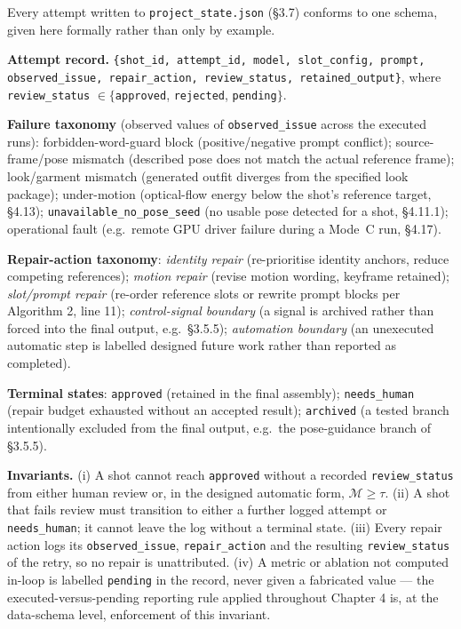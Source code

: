 \documentclass[10pt,twocolumn,letterpaper]{article}
\begin{document}
Every attempt written to \texttt{project\_state.json} (\S{}3.7) conforms to one schema, given here formally rather than only by example.

\textbf{Attempt record.} \texttt{\{shot\_id, attempt\_id, model, slot\_config, prompt, observed\_issue, repair\_action, review\_status, retained\_output\}}, where \texttt{review\_status} $\in \{$\texttt{approved}, \texttt{rejected}, \texttt{pending}$\}$.

\textbf{Failure taxonomy} (observed values of \texttt{observed\_issue} across the executed runs): forbidden-word-guard block (positive/negative prompt conflict); source-frame/pose mismatch (described pose does not match the actual reference frame); look/garment mismatch (generated outfit diverges from the specified look package); under-motion (optical-flow energy below the shot's reference target, \S{}4.13); \texttt{unavailable\_no\_pose\_seed} (no usable pose detected for a shot, \S{}4.11.1); operational fault (e.g.\ remote GPU driver failure during a Mode~C run, \S{}4.17).

\textbf{Repair-action taxonomy}: \emph{identity repair} (re-prioritise identity anchors, reduce competing references); \emph{motion repair} (revise motion wording, keyframe retained); \emph{slot/prompt repair} (re-order reference slots or rewrite prompt blocks per Algorithm 2, line 11); \emph{control-signal boundary} (a signal is archived rather than forced into the final output, e.g.\ \S{}3.5.5); \emph{automation boundary} (an unexecuted automatic step is labelled designed future work rather than reported as completed).

\textbf{Terminal states}: \texttt{approved} (retained in the final assembly); \texttt{needs\_human} (repair budget exhausted without an accepted result); \texttt{archived} (a tested branch intentionally excluded from the final output, e.g.\ the pose-guidance branch of \S{}3.5.5).

\textbf{Invariants.} (i) A shot cannot reach \texttt{approved} without a recorded \texttt{review\_status} from either human review or, in the designed automatic form, $\mathcal{M} \geq \tau$. (ii) A shot that fails review must transition to either a further logged attempt or \texttt{needs\_human}; it cannot leave the log without a terminal state. (iii) Every repair action logs its \texttt{observed\_issue}, \texttt{repair\_action} and the resulting \texttt{review\_status} of the retry, so no repair is unattributed. (iv) A metric or ablation not computed in-loop is labelled \texttt{pending} in the record, never given a fabricated value --- the executed-versus-pending reporting rule applied throughout Chapter 4 is, at the data-schema level, enforcement of this invariant.
\end{document}
